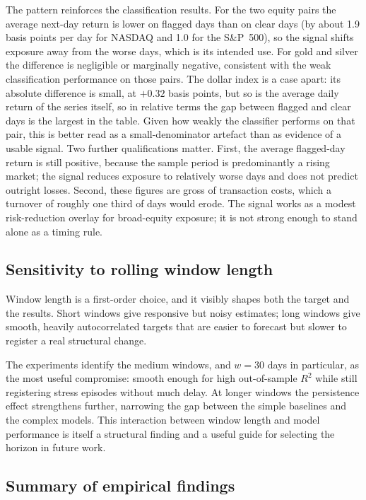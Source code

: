 The pattern reinforces the classification results. For the two equity pairs the average next-day return is lower on flagged days than on clear days (by about 1.9 basis points per day for NASDAQ and 1.0 for the S\&P~500), so the signal shifts exposure away from the worse days, which is its intended use. For gold and silver the difference is negligible or marginally negative, consistent with the weak classification performance on those pairs. The dollar index is a case apart: its absolute difference is small, at $+0.32$ basis points, but so is the average daily return of the series itself, so in relative terms the gap between flagged and clear days is the largest in the table. Given how weakly the classifier performs on that pair, this is better read as a small-denominator artefact than as evidence of a usable signal. Two further qualifications matter. First, the average flagged-day return is still positive, because the sample period is predominantly a rising market; the signal reduces exposure to relatively worse days and does not predict outright losses. Second, these figures are gross of transaction costs, which a turnover of roughly one third of days would erode. The signal works as a modest risk-reduction overlay for broad-equity exposure; it is not strong enough to stand alone as a timing rule.

\subsection{Sensitivity to rolling window length}
\label{sec:window_sensitivity}

Window length is a first-order choice, and it visibly shapes both the target and the results. Short windows give responsive but noisy estimates; long windows give smooth, heavily autocorrelated targets that are easier to forecast but slower to register a real structural change.

The experiments identify the medium windows, and $w = 30$ days in particular, as the most useful compromise: smooth enough for high out-of-sample $R^2$ while still registering stress episodes without much delay. At longer windows the persistence effect strengthens further, narrowing the gap between the simple baselines and the complex models. This interaction between window length and model performance is itself a structural finding and a useful guide for selecting the horizon in future work.

\subsection{Summary of empirical findings}

